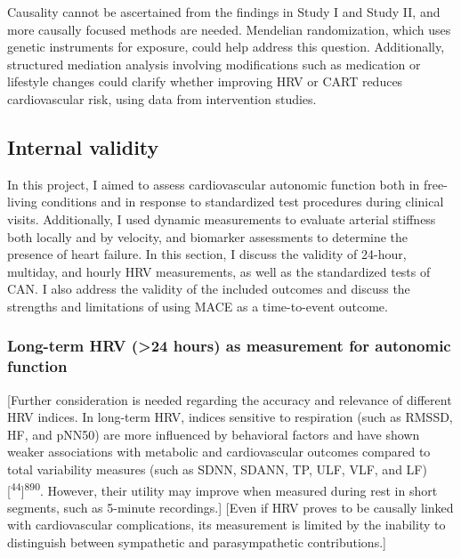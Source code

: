 \documentclass[
  a4paper,
  headsepline=true,
  open=any]{scrbook}
\begin{document}
Causality cannot be ascertained from the findings in Study I and Study
II, and more causally focused methods are needed. Mendelian
randomization, which uses genetic instruments for exposure, could help
address this question. Additionally, structured mediation analysis
involving modifications such as medication or lifestyle changes could
clarify whether improving HRV or CART reduces cardiovascular risk, using
data from intervention studies.

\hypertarget{internal-validity}{%
\subsection{Internal validity}\label{internal-validity}}

In this project, I aimed to assess cardiovascular autonomic function
both in free-living conditions and in response to standardized test
procedures during clinical visits. Additionally, I used dynamic
measurements to evaluate arterial stiffness both locally and by
velocity, and biomarker assessments to determine the presence of heart
failure. In this section, I discuss the validity of 24-hour, multiday,
and hourly HRV measurements, as well as the standardized tests of CAN. I
also address the validity of the included outcomes and discuss the
strengths and limitations of using MACE as a time-to-event outcome.

\hypertarget{long-term-hrv-24-hours-as-measurement-for-autonomic-function}{%
\subsubsection{Long-term HRV (\textgreater24 hours) as measurement for
autonomic
function}\label{long-term-hrv-24-hours-as-measurement-for-autonomic-function}}

{[}Further consideration is needed regarding the accuracy and relevance
of different HRV indices. In long-term HRV, indices sensitive to
respiration (such as RMSSD, HF, and pNN50) are more influenced by
behavioral factors and have shown weaker associations with metabolic and
cardiovascular outcomes compared to total variability measures (such as
SDNN, SDANN, TP, ULF, VLF, and
LF){[}\textsuperscript{44}{]}\textsuperscript{8}\textsuperscript{90}.
However, their utility may improve when measured during rest in short
segments, such as 5-minute recordings.{]} {[}Even if HRV proves to be
causally linked with cardiovascular complications, its measurement is
limited by the inability to distinguish between sympathetic and
parasympathetic contributions.{]}
\end{document}
